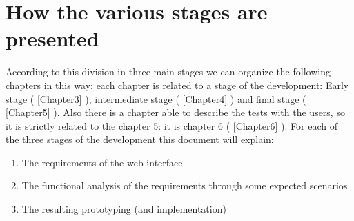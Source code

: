 \section{How the various stages are presented}
According to this division in three main stages we can organize the following chapters in this way:
each chapter is related to a stage of the development: Early stage (  \ref{Chapter3} ), intermediate stage ( \ref{Chapter4} ) and final stage ( \ref{Chapter5} ). Also there is a chapter able to describe the tests with the users, so it is strictly related to the chapter 5: it is chapter 6 ( \ref{Chapter6} ).
For each of the three stages of the development this document will explain:

\begin {enumerate}

\item
The requirements of the web interface.

\item
The functional analysis of the requirements through some expected scenarios

\item
The resulting prototyping (and implementation)  

\end {enumerate} 



 